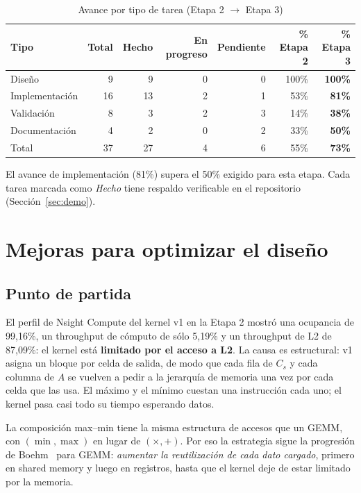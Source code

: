 \documentclass[11pt,a4paper]{article}
\begin{document}
\begin{table}[h]
\centering
\caption{Avance por tipo de tarea (Etapa 2 $\rightarrow$ Etapa 3)}\label{tab:avance}
\begin{tabular}{lrrrrrr}
\toprule
\textbf{Tipo} & \textbf{Total} & \textbf{Hecho} & \textbf{En progreso} & \textbf{Pendiente} &
\textbf{\% Etapa 2} & \textbf{\% Etapa 3}\\
\midrule
Diseño         & 9  & 9  & 0 & 0  & 100\% & \textbf{100\%}\\
Implementación & 16 & 13 & 2 & 1  & 53\%  & \textbf{81\%}\\
Validación     & 8  & 3  & 2 & 3  & 14\%  & \textbf{38\%}\\
Documentación  & 4  & 2  & 0 & 2  & 33\%  & \textbf{50\%}\\
\midrule
Total          & 37 & 27 & 4 & 6  & 55\%  & \textbf{73\%}\\
\bottomrule
\end{tabular}
\end{table}

El avance de implementación (81\%) supera el 50\% exigido para esta etapa. Cada tarea
marcada como \emph{Hecho} tiene respaldo verificable en el repositorio
(Sección~\ref{sec:demo}).

\section{Mejoras para optimizar el diseño}\label{sec:mejoras}

\subsection{Punto de partida}
El perfil de Nsight Compute del kernel v1 en la Etapa 2 mostró una ocupancia de 99,16\%,
un throughput de cómputo de sólo 5,19\% y un throughput de L2 de 87,09\%: el kernel está
\textbf{limitado por el acceso a L2}. La causa es estructural: v1 asigna un bloque por celda
de salida, de modo que cada fila de $C_s$ y cada columna de $A$ se vuelven a pedir a la
jerarquía de memoria una vez por cada celda que las usa. El máximo y el mínimo cuestan una
instrucción cada uno; el kernel pasa casi todo su tiempo esperando datos.

La composición max--min tiene la misma estructura de accesos que un GEMM, con
$(\min,\max)$ en lugar de $(\times,+)$. Por eso la estrategia sigue la progresión de
Boehm~\cite{boehm} para GEMM: \emph{aumentar la reutilización de cada dato cargado}, primero
en shared memory y luego en registros, hasta que el kernel deje de estar limitado por la
memoria.
\end{document}
